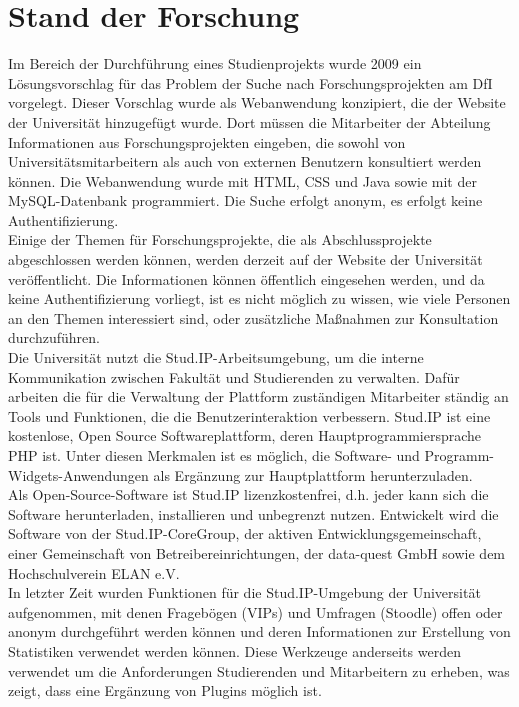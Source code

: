 \section{Stand der Forschung}
Im Bereich der Durchführung eines Studienprojekts wurde 2009\cite{Watat:2019} ein Lösungsvorschlag für das Problem der Suche nach Forschungsprojekten am DfI vorgelegt. Dieser Vorschlag wurde als Webanwendung konzipiert, die der Website der Universität hinzugefügt wurde. Dort müssen die Mitarbeiter der Abteilung Informationen aus Forschungsprojekten eingeben, die sowohl von Universitätsmitarbeitern als auch von externen Benutzern konsultiert werden können.
Die Webanwendung wurde mit HTML, CSS und Java sowie mit der MySQL-Datenbank programmiert. Die Suche erfolgt anonym, es erfolgt keine Authentifizierung.\\

Einige der Themen für Forschungsprojekte, die als Abschlussprojekte abgeschlossen werden können, werden derzeit auf der Website der Universität veröffentlicht. Die Informationen können öffentlich eingesehen werden, und da keine Authentifizierung vorliegt, ist es nicht möglich zu wissen, wie viele Personen an den Themen interessiert sind, oder zusätzliche Ma{\ss}nahmen zur Konsultation durchzuführen.\\

Die Universität nutzt die Stud.IP-Arbeitsumgebung, um die interne Kommunikation zwischen Fakultät und Studierenden zu verwalten. Dafür arbeiten die für die Verwaltung der Plattform zuständigen Mitarbeiter ständig an Tools und Funktionen, die die Benutzerinteraktion verbessern.
Stud.IP ist eine kostenlose, Open Source Softwareplattform, deren Hauptprogrammiersprache PHP ist\cite{SIPPHP:2020}. Unter diesen Merkmalen ist es möglich, die Software- und Programm-Widgets-Anwendungen als Ergänzung zur Hauptplattform herunterzuladen.\\
Als Open-Source-Software ist Stud.IP lizenzkostenfrei\cite{SIPOS:2020}, d.h. jeder kann sich die Software herunterladen, installieren und unbegrenzt nutzen. Entwickelt wird die Software von der Stud.IP-CoreGroup, der aktiven Entwicklungsgemeinschaft, einer Gemeinschaft von Betreibereinrichtungen, der data-quest GmbH sowie dem Hochschulverein ELAN e.V.\\

In letzter Zeit wurden Funktionen für die Stud.IP-Umgebung der Universität aufgenommen, mit denen Fragebögen (VIPs) und Umfragen (Stoodle) offen oder anonym durchgeführt werden können und deren Informationen zur Erstellung von Statistiken verwendet werden können. Diese Werkzeuge anderseits werden verwendet um die Anforderungen Studierenden und Mitarbeitern zu erheben, was zeigt, dass eine Ergänzung von Plugins möglich ist.